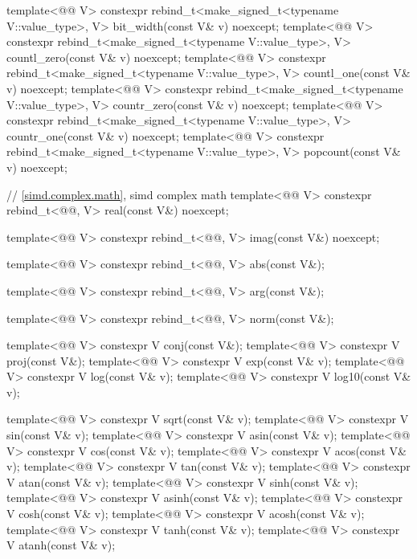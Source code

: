 \begin{codeblock}
{  template<@@ V>
    constexpr rebind_t<make_signed_t<typename V::value_type>, V> bit_width(const V& v) noexcept;
  template<@@ V>
    constexpr rebind_t<make_signed_t<typename V::value_type>, V>
    countl_zero(const V& v) noexcept;
  template<@@ V>
    constexpr rebind_t<make_signed_t<typename V::value_type>, V> countl_one(const V& v) noexcept;
  template<@@ V>
    constexpr rebind_t<make_signed_t<typename V::value_type>, V>
    countr_zero(const V& v) noexcept;
  template<@@ V>
    constexpr rebind_t<make_signed_t<typename V::value_type>, V> countr_one(const V& v) noexcept;
  template<@@ V>
    constexpr rebind_t<make_signed_t<typename V::value_type>, V> popcount(const V& v) noexcept;

  // \ref{simd.complex.math}, simd complex math
  template<@@ V>
    constexpr rebind_t<@@, V> real(const V&) noexcept;

  template<@@ V>
    constexpr rebind_t<@@, V> imag(const V&) noexcept;

  template<@@ V>
    constexpr rebind_t<@@, V> abs(const V&);

  template<@@ V>
    constexpr rebind_t<@@, V> arg(const V&);

  template<@@ V>
    constexpr rebind_t<@@, V> norm(const V&);

  template<@@ V> constexpr V conj(const V&);
  template<@@ V> constexpr V proj(const V&);
  template<@@ V> constexpr V exp(const V& v);
  template<@@ V> constexpr V log(const V& v);
  template<@@ V> constexpr V log10(const V& v);

  template<@@ V> constexpr V sqrt(const V& v);
  template<@@ V> constexpr V sin(const V& v);
  template<@@ V> constexpr V asin(const V& v);
  template<@@ V> constexpr V cos(const V& v);
  template<@@ V> constexpr V acos(const V& v);
  template<@@ V> constexpr V tan(const V& v);
  template<@@ V> constexpr V atan(const V& v);
  template<@@ V> constexpr V sinh(const V& v);
  template<@@ V> constexpr V asinh(const V& v);
  template<@@ V> constexpr V cosh(const V& v);
  template<@@ V> constexpr V acosh(const V& v);
  template<@@ V> constexpr V tanh(const V& v);
  template<@@ V> constexpr V atanh(const V& v);

}
\end{codeblock}
